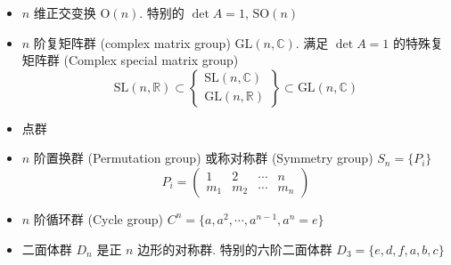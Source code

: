 \documentclass[12pt,a4paper]{article}%
\numberwithin{equation}{section}%
\begin{document}
\begin{enumerate}
\begin{itemize}
		\item $n$ 维正交变换 $\mbox{O}(n)$. 特别的 $\det A = 1$, $\mbox{SO}(n)$
		\item $n$ 阶复矩阵群 (complex matrix group) $\mbox{GL}(n,\mathbb C)$. 满足 $\det A = 1$ 的特殊复矩阵群 (Complex special matrix group)
		\begin{equation}
			\mbox{SL}(n,\mathbb R) \subset \begin{Bmatrix}
				\mbox{SL}(n,\mathbb C) \\
				\mbox{GL}(n,\mathbb R)
			\end{Bmatrix}\subset \mbox{GL}(n,\mathbb C)
		\end{equation}
		\item 点群
		\item $n$ 阶置换群 (Permutation group) 或称对称群 (Symmetry group) $S_n = \{P_i\}$
		$$
		 P_i = \begin{pmatrix}
		 	1 & 2 & \cdots & n \\
		 	m_1 & m_2 & \cdots & m_n
		 \end{pmatrix}
		$$
		\item $n$ 阶循环群 (Cycle group) $C^n = \{a, a^2, \cdots, a^{n-1}, a^n = e\}$
		\item 二面体群 $D_{n}$ 是正 $n$ 边形的对称群. 特别的六阶二面体群 $D_3 = \{e,d,f,a,b,c\}$
	\end{itemize}
\end{enumerate}
\end{document}
